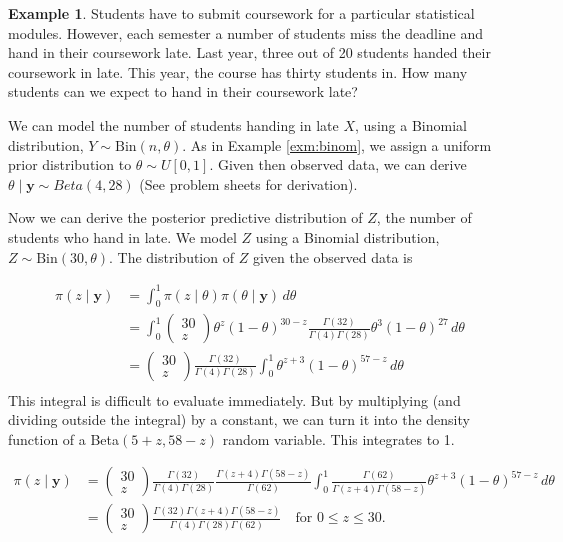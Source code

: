 \documentclass[
]{book}
\theoremstyle{definition}
\theoremstyle{definition}
\newtheorem{example}{Example}[chapter]
\theoremstyle{definition}
\theoremstyle{definition}
\theoremstyle{remark}
\begin{document}
\begin{example}

Students have to submit coursework for a particular statistical modules. However, each semester a number of students miss the deadline and hand in their coursework late. Last year, three out of 20 students handed their coursework in late. This year, the course has thirty students in. How many students can we expect to hand in their coursework late?

We can model the number of students handing in late \(X\), using a Binomial distribution, \(Y \sim \textrm{Bin}(n, \theta)\). As in Example \ref{exm:binom}, we assign a uniform prior distribution to \(\theta \sim U[0, 1]\). Given then observed data, we can derive \(\theta \mid \boldsymbol{y} \sim Beta(4, 28)\) (See problem sheets for derivation).

Now we can derive the posterior predictive distribution of \(Z\), the number of students who hand in late. We model \(Z\) using a Binomial distribution, \(Z \sim \textrm{Bin}(30, \theta)\). The distribution of \(Z\) given the observed data is

\begin{align*}
\pi(z \mid \boldsymbol{y}) &= \int_0^1 \pi(z \mid \theta) \pi(\theta \mid \boldsymbol{y})\, d\theta \\
& = \int_0^1 \begin{pmatrix} 30 \\ z \end{pmatrix} \theta^z (1-\theta)^{30 - z} \frac{\Gamma(32)}{\Gamma(4)\Gamma(28)}\theta^{3}(1-\theta)^{27}\, d\theta \\
 & = \begin{pmatrix} 30 \\ z \end{pmatrix}\frac{\Gamma(32)}{\Gamma(4)\Gamma(28)}\int_0^1 \theta^{z + 3}(1-\theta)^{57 - z}\, d\theta \\
\end{align*}
This integral is difficult to evaluate immediately. But by multiplying (and dividing outside the integral) by a constant, we can turn it into the density function of a Beta\((5 + z, 58 - z)\) random variable. This integrates to 1.

\begin{align*}
\pi(z \mid \boldsymbol{y})  & = \begin{pmatrix} 30 \\ z \end{pmatrix}\frac{\Gamma(32)}{\Gamma(4)\Gamma(28)}\frac{\Gamma(z+4)\Gamma(58-z)}{\Gamma(62)}\int_0^1 \frac{\Gamma(62)}{\Gamma(z+4)\Gamma(58-z)}\theta^{z + 3}(1-\theta)^{57 - z}\, d\theta \\ 
& = \begin{pmatrix} 30 \\ z \end{pmatrix}\frac{\Gamma(32)\Gamma(z+4)\Gamma(58-z)}{\Gamma(4)\Gamma(28)\Gamma(62)} \quad \textrm{for } 0 \leq z \leq 30.
\end{align*}


\end{example}
\end{document}
